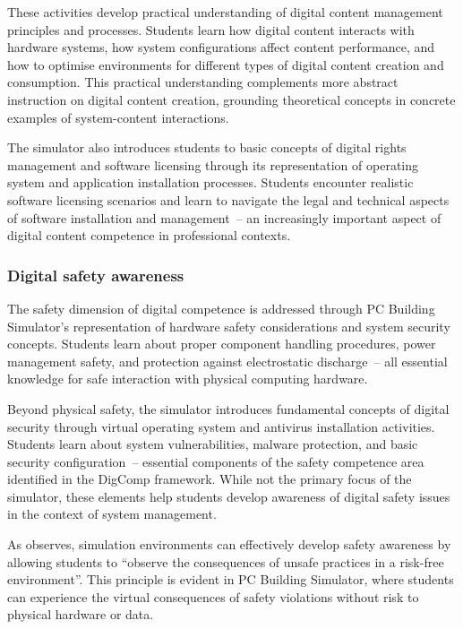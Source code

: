 \documentclass[cte]{acnsart}
\begin{document}
These activities develop practical understanding of digital content management principles and processes. Students learn how digital content interacts with hardware systems, how system configurations affect content performance, and how to optimise environments for different types of digital content creation and consumption. This practical understanding complements more abstract instruction on digital content creation, grounding theoretical concepts in concrete examples of system-content interactions.

The simulator also introduces students to basic concepts of digital rights management and software licensing through its representation of operating system and application installation processes. Students encounter realistic software licensing scenarios and learn to navigate the legal and technical aspects of software installation and management~-- an increasingly important aspect of digital content competence in professional contexts.

\subsubsection{Digital safety awareness}

The safety dimension of digital competence is addressed through PC Building Simulator's representation of hardware safety considerations and system security concepts. Students learn about proper component handling procedures, power management safety, and protection against electrostatic discharge~-- all essential knowledge for safe interaction with physical computing hardware.

Beyond physical safety, the simulator introduces fundamental concepts of digital security through virtual operating system and antivirus installation activities. Students learn about system vulnerabilities, malware protection, and basic security configuration~-- essential components of the safety competence area identified in the DigComp framework. While not the primary focus of the simulator, these elements help students develop awareness of digital safety issues in the context of system management.

As \citet{Petr2007629} observes, simulation environments can effectively develop safety awareness by allowing students to ``observe the consequences of unsafe practices in a risk-free environment''. This principle is evident in PC Building Simulator, where students can experience the virtual consequences of safety violations without risk to physical hardware or data.
\end{document}
